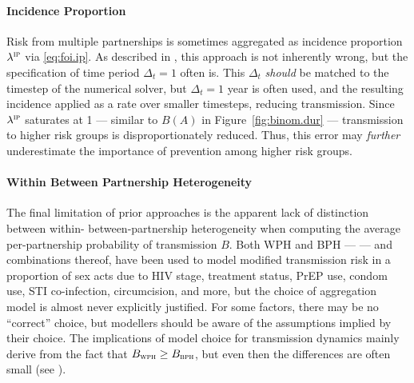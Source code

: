 \paragraph{Incidence Proportion}
Risk from multiple partnerships is sometimes aggregated as
incidence proportion $\lambda^\textsc{ip}$ via \eqref{eq:foi.ip}.
As described in , this approach is not inherently wrong,
but the specification of time period $\Delta_t = 1$ often is.
This $\Delta_t$ \emph{should} be matched to the timestep of the numerical solver,
but $\Delta_t = 1$ year is often used,
and the resulting incidence applied as a rate over smaller timesteps, reducing transmission.
Since $\lambda^\textsc{ip}$ saturates at 1 --- similar to $B(A)$ in Figure~\ref{fig:binom.dur} ---
transmission to higher risk groups is disproportionately reduced.
Thus, this error may \emph{further} underestimate
the importance of prevention among higher risk groups.
\paragraph{Within \vs Between Partnership Heterogeneity}
The final limitation of prior approaches is the apparent lack of distinction between
within- \vs between-partnership heterogeneity when computing
the average per-partnership probability of transmission $B$.
Both WPH and BPH --- \ie {} --- and combinations thereof, have been used
to model modified transmission risk in a proportion of sex acts due to
HIV stage, treatment status, PrEP use, condom use, STI co-infection, circumcision, and more,
but the choice of aggregation model is almost never explicitly justified.
For some factors, there may be no ``correct'' choice,
but modellers should be aware of the assumptions implied by their choice.
The implications of model choice for transmission dynamics
mainly derive from the fact that $B_{\textsc{wph}} \ge B_{\textsc{bph}}$,
but even then the differences are often small (see ).
